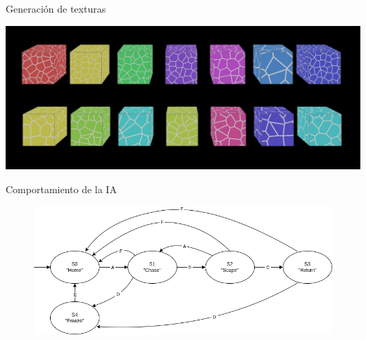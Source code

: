 \documentclass{beamer}
\begin{document}
   \begin{frame}{Generación de texturas \scriptsize{\hfill \secname}}
    
        \begin{center}
            \includegraphics[scale=0.225]{img/texturas.png}
        \end{center}
        
    \end{frame}
    
   \begin{frame}{Comportamiento de la IA \scriptsize{\hfill \secname}}
    
        \begin{figure}[H]
            \begin{center}
                \includegraphics[scale=0.4]{img/estado_fantasmas.png}
            \end{center}
        \end{figure}   
        
    \end{frame}
    
\end{document}
